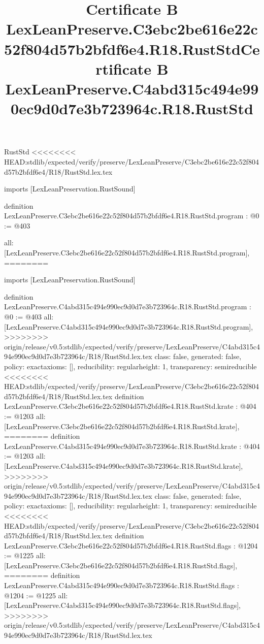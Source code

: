 \begin{lexlean}{RustStd}
<<<<<<<< HEAD:stdlib/expected/verify/preserve/LexLeanPreserve/C3ebc2be616e22c52f804d57b2bfdf6e4/R18/RustStd.lex.tex
\title{Certificate B LexLeanPreserve.C3ebc2be616e22c52f804d57b2bfdf6e4.R18.RustStd}
\begin{coremodule}
imports [LexLeanPreservation.RustSound]

definition LexLeanPreserve.C3ebc2be616e22c52f804d57b2bfdf6e4.R18.RustStd.program : @0 := @403 {
  all: [LexLeanPreserve.C3ebc2be616e22c52f804d57b2bfdf6e4.R18.RustStd.program],
========
\title{Certificate B LexLeanPreserve.C4abd315c494e990ec9d0d7e3b723964c.R18.RustStd}
\begin{coremodule}
imports [LexLeanPreservation.RustSound]

definition LexLeanPreserve.C4abd315c494e990ec9d0d7e3b723964c.R18.RustStd.program : @0 := @403 {
  all: [LexLeanPreserve.C4abd315c494e990ec9d0d7e3b723964c.R18.RustStd.program],
>>>>>>>> origin/release/v0.5:stdlib/expected/verify/preserve/LexLeanPreserve/C4abd315c494e990ec9d0d7e3b723964c/R18/RustStd.lex.tex
  class: false,
  generated: false,
  policy: exact{axioms: []},
  reducibility: regular{height: 1},
  transparency: semireducible
}
<<<<<<<< HEAD:stdlib/expected/verify/preserve/LexLeanPreserve/C3ebc2be616e22c52f804d57b2bfdf6e4/R18/RustStd.lex.tex
definition LexLeanPreserve.C3ebc2be616e22c52f804d57b2bfdf6e4.R18.RustStd.krate : @404 := @1203 {
  all: [LexLeanPreserve.C3ebc2be616e22c52f804d57b2bfdf6e4.R18.RustStd.krate],
========
definition LexLeanPreserve.C4abd315c494e990ec9d0d7e3b723964c.R18.RustStd.krate : @404 := @1203 {
  all: [LexLeanPreserve.C4abd315c494e990ec9d0d7e3b723964c.R18.RustStd.krate],
>>>>>>>> origin/release/v0.5:stdlib/expected/verify/preserve/LexLeanPreserve/C4abd315c494e990ec9d0d7e3b723964c/R18/RustStd.lex.tex
  class: false,
  generated: false,
  policy: exact{axioms: []},
  reducibility: regular{height: 1},
  transparency: semireducible
}
<<<<<<<< HEAD:stdlib/expected/verify/preserve/LexLeanPreserve/C3ebc2be616e22c52f804d57b2bfdf6e4/R18/RustStd.lex.tex
definition LexLeanPreserve.C3ebc2be616e22c52f804d57b2bfdf6e4.R18.RustStd.flags : @1204 := @1225 {
  all: [LexLeanPreserve.C3ebc2be616e22c52f804d57b2bfdf6e4.R18.RustStd.flags],
========
definition LexLeanPreserve.C4abd315c494e990ec9d0d7e3b723964c.R18.RustStd.flags : @1204 := @1225 {
  all: [LexLeanPreserve.C4abd315c494e990ec9d0d7e3b723964c.R18.RustStd.flags],
>>>>>>>> origin/release/v0.5:stdlib/expected/verify/preserve/LexLeanPreserve/C4abd315c494e990ec9d0d7e3b723964c/R18/RustStd.lex.tex
}}}
\end{coremodule}}
\end{coremodule}
\end{lexlean}
